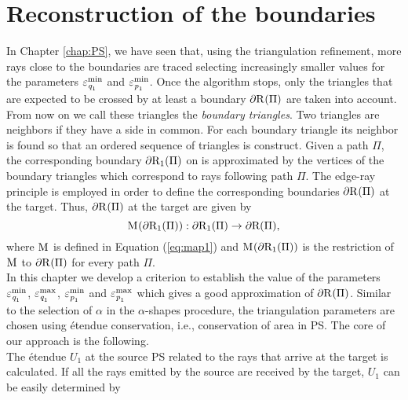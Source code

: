 \section{Reconstruction of the boundaries}
In Chapter \ref{chap:PS}, we have seen that, using the triangulation refinement, more rays close to the boundaries are traced selecting increasingly smaller values for the parameters $\varepsilon_{\textit{q}_1}^{\textrm{min}}$ and $\varepsilon_{\textit{p}_1}^{\textrm{min}}$. Once the algorithm stops, only the triangles that are expected to be crossed by at least a boundary $\partial \mbox{$\textup{R}_{\textit{}}$}(\Pi)$ are taken into account. From now on we call these triangles the \textit{boundary triangles}. Two triangles are neighbors if they have a side in common. For each boundary triangle its neighbor is found so that an ordered sequence of triangles is construct. Given a path $\Pi$, the corresponding boundary $\partial\mbox{$\textup{R}_{\textit{$1$}}$}(\Pi)$ on  is approximated by the vertices of the boundary triangles which correspond to rays following path $\Pi$. The edge-ray principle is employed in order to define the corresponding boundaries $\partial \mbox{$\textup{R}_{\textit{}}$}(\Pi)$ at the target.
Thus, $\partial \mbox{$\textup{R}_{\textit{}}$}(\Pi)$ at the target are given by
\begin{equation}\mathrm{M}_{\textit{}}(\partial\mbox{$\textup{R}_{\textit{$1$}}$}(\Pi)):\partial\mbox{$\textup{R}_{\textit{$1$}}$}(\Pi)\rightarrow\partial\mbox{{R}{}{}}(\Pi),\end{equation}
where $\mathrm{M}_{\textit{}}$ is defined in Equation (\ref{eq:map1}) and $\mathrm{M}_{\textit{}}(\partial\mbox{$\textup{R}_{\textit{$1$}}$}(\Pi))$ is the restriction of $\mathrm{M}_{\textit{}}$ to $\partial\mbox{$\textup{R}_{\textit{}}$}(\Pi)$ for every path 
$\Pi$. \\\indent In this chapter we develop a criterion to establish the value of the parameters $\varepsilon_{\textit{q}_1}^{\textrm{min}}$, $\varepsilon_{\textit{q}_1}^{\textrm{max}}$, $\varepsilon_{\textit{p}_1}^{\textrm{min}}$ and $\varepsilon_{\textit{p}_1}^{\textrm{max}}$ which gives a good approximation of $\partial \mbox{$\textup{R}_{\textit{}}$}(\Pi)$.
 Similar to the selection of $\alpha$ in the $\alpha$-shapes procedure, the triangulation parameters are chosen using \'{e}tendue conservation, i.e., conservation of area in PS. The core of our approach is the following.\\
\indent The \'{e}tendue $U_1$ at the source PS  related to the rays that arrive at the target is calculated. If all the rays emitted by the source are received by the target, $U_1$ can be easily determined by
